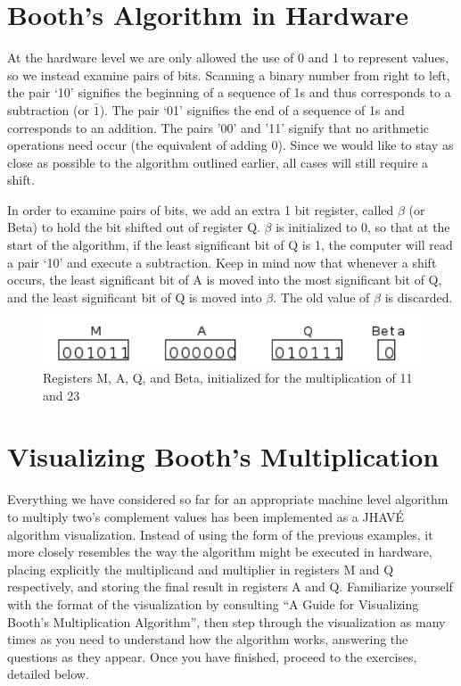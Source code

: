 \documentclass{article}
\begin{document}

\section{Booth's Algorithm in Hardware}
    At the hardware level we are only allowed the use of 0 and 1 to represent values, so we instead examine pairs of bits.
Scanning a binary number from right to left, the pair `10' signifies the beginning of a sequence of 1s and thus corresponds to a subtraction (or $\bar{1}$).
The pair `01' signifies the end of a sequence of 1s and corresponds to an addition.
The pairs '00' and '11' signify that no arithmetic operations need occur (the equivalent of adding 0).
Since we would like to stay as close as possible to the algorithm outlined earlier, all cases will still require a shift.

    In order to examine pairs of bits, we add an extra 1 bit register, called $\beta$ (or Beta) to hold the bit shifted out of register Q.
$\beta$ is initialized to 0, so that at the start of the algorithm, if the least significant bit of Q is 1, the computer will read a pair `10' and execute a subtraction.
Keep in mind now that whenever a shift occurs, the least significant bit of A is moved into the most significant bit of Q, and the least significant bit of Q is moved into $\beta$.
The old value of $\beta$ is discarded.

\begin{figure}[h]
\centering
\includegraphics{init2.pdf}
\caption{Registers M, A, Q, and Beta, initialized for the multiplication of 11 and 23}
\end{figure}%

\pagebreak

\section{Visualizing Booth's Multiplication}
Everything we have considered so far for an appropriate machine level algorithm to multiply two's complement values has been implemented as a JHAVÉ algorithm visualization.
Instead of using the form of the previous examples, it more closely resembles the way the algorithm might be executed in hardware, placing explicitly the multiplicand and multiplier in registers M and Q respectively, and storing the final result in registers A and Q.
Familiarize yourself with the format of the visualization by consulting ``A Guide for Visualizing Booth’s Multiplication Algorithm'', then step through the visualization as many times as you need to understand how the algorithm works, answering the questions as they appear.
Once you have finished, proceed to the exercises, detailed below.
\end{document}
